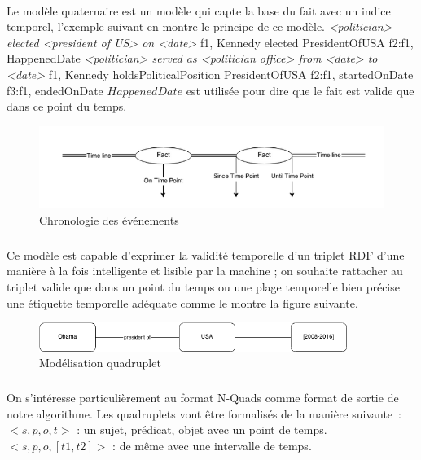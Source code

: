 \documentclass[12pt,a4	]{report}
\begin{document}
\paragraph{}
Le modèle quaternaire est un modèle qui capte la base du fait avec un indice temporel, l'exemple suivant en montre le principe de ce modèle.
\newline
{\it <politician> elected <president of US> on <date>}
\newline
f1, Kennedy elected PresidentOfUSA 
\newline
f2:f1, HappenedDate
\newline
{\it <politician> served as <politician office> from <date> to <date>}
\newline
f1, Kennedy holdsPoliticalPosition PresidentOfUSA 
\newline
f2:f1, startedOnDate 
\newline
f3:f1, endedOnDate
\newline
$HappenedDate$ est utilisée pour dire que le fait est valide que dans ce point du temps.
\begin{figure}[H]
        \centering
                \centering
                \includegraphics[width=13cm]{timeline.png}
               \caption{Chronologie des événements}

\end{figure}
\subparagraph{}
Ce modèle est capable d'exprimer la validité temporelle d’un triplet RDF d’une manière à la fois intelligente et lisible par la machine ; on souhaite rattacher au triplet valide que dans un point du temps ou une plage temporelle bien précise une étiquette temporelle adéquate comme le montre la figure suivante.
\begin{figure}[H]
        \centering
                \centering
                \includegraphics[width=10cm]{obamaQuad.png}
               \caption{Modélisation quadruplet}

\end{figure}
\subparagraph{}
On s'intéresse particulièrement au format N-Quads comme format de sortie de notre algorithme. Les quadruplets vont être formalisés de la manière suivante~:
\newline
$<s,p,o,t>$ : un sujet, prédicat, objet avec un point de temps.
\newline
$<s,p,o,[t1,t2]>$ : de même avec une intervalle de temps.
\end{document}
